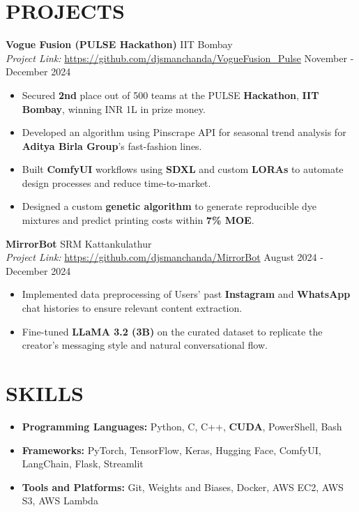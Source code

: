 \documentclass[a4paper,9pt]{extarticle}
\begin{document}
\section*{PROJECTS}

\noindent
\textbf{Vogue Fusion (PULSE Hackathon)} \hfill IIT Bombay\\
\textit{Project Link:} \url{https://github.com/djsmanchanda/VogueFusion_Pulse} \hfill November - December 2024
\begin{itemize}
    \item Secured \textbf{2nd} place out of 500 teams at the PULSE \textbf{Hackathon},\textbf{ IIT Bombay}, winning INR 1L in prize money.
    \item Developed an algorithm using Pinscrape API for seasonal trend analysis for \textbf{Aditya Birla Group}’s fast-fashion lines.
    \item Built \textbf{ComfyUI} workflows using \textbf{SDXL} and custom \textbf{LORAs} to automate design processes and reduce time-to-market.
    \item Designed a custom \textbf{genetic algorithm} to generate reproducible dye mixtures and predict printing costs within \textbf{7\% MOE}.
\end{itemize}


\noindent
\textbf{MirrorBot} \hfill SRM Kattankulathur\\
\textit{Project Link:} \url{https://github.com/djsmanchanda/MirrorBot} \hfill August 2024 - December 2024
\begin{itemize}
    \item Implemented data preprocessing of Users' past \textbf{Instagram} and \textbf{WhatsApp} chat histories to ensure relevant content extraction.   
    \item Fine-tuned \textbf{LLaMA 3.2 (3B)} on the curated dataset to replicate the creator's messaging style and natural conversational flow.
\end{itemize}

\section*{SKILLS}
\begin{itemize}
    \item \textbf{Programming Languages:} Python, C, C++, \textbf{CUDA}, PowerShell, Bash
    \item \textbf{Frameworks:} PyTorch, TensorFlow, Keras, Hugging Face, ComfyUI, LangChain, Flask, Streamlit
    \item \textbf{Tools and Platforms:} Git, Weights and Biases, Docker, AWS EC2, AWS S3, AWS Lambda
\end{itemize}
\end{document}
